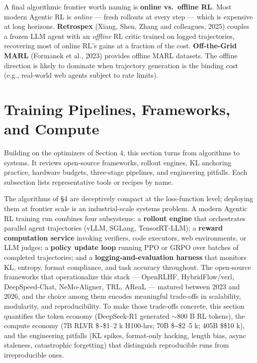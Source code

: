 A final algorithmic frontier worth naming is \textbf{online vs.~offline RL}. Most modern Agentic RL is \emph{online} --- fresh rollouts at every step --- which is expensive at long horizons. \textbf{Retrospex} (Xiang, Shen, Zhang and colleagues, 2025) couples a frozen LLM agent with an \emph{offline} RL critic trained on logged trajectories, recovering most of online RL's gains at a fraction of the cost. \textbf{Off-the-Grid MARL} (Formanek et al., 2023) provides offline MARL datasets. The offline direction is likely to dominate when trajectory generation is the binding cost (e.g., real-world web agents subject to rate limits).

\section{Training Pipelines, Frameworks, and Compute}\label{training-pipelines-frameworks-and-compute}

Building on the optimizers of Section 4, this section turns from algorithms to systems. It reviews open-source frameworks, rollout engines, KL anchoring practice, hardware budgets, three-stage pipelines, and engineering pitfalls. Each subsection lists representative tools or recipes by name.

The algorithms of §4 are deceptively compact at the loss-function level; deploying them at frontier scale is an industrial-scale systems problem. A modern Agentic RL training run combines four subsystems: a \textbf{rollout engine} that orchestrates parallel agent trajectories (vLLM, SGLang, TensorRT-LLM); a \textbf{reward computation service} invoking verifiers, code executors, web environments, or LLM judges; a \textbf{policy update loop} running PPO or GRPO over batches of completed trajectories; and a \textbf{logging-and-evaluation harness} that monitors KL, entropy, format compliance, and task accuracy throughout. The open-source frameworks that operationalize this stack --- OpenRLHF, HybridFlow/verl, DeepSpeed-Chat, NeMo-Aligner, TRL, AReaL --- matured between 2023 and 2026, and the choice among them encodes meaningful trade-offs in scalability, modularity, and reproducibility. To make those trade-offs concrete, this section quantifies the token economy (DeepSeek-R1 generated \(\sim 800\) B RL tokens), the compute economy (7B RLVR \$\sim\$1--2 k H100-hrs; 70B \$\sim\$2--5 k; 405B \$\geq\$10 k), and the engineering pitfalls (KL spikes, format-only hacking, length bias, async staleness, catastrophic forgetting) that distinguish reproducible runs from irreproducible ones.

